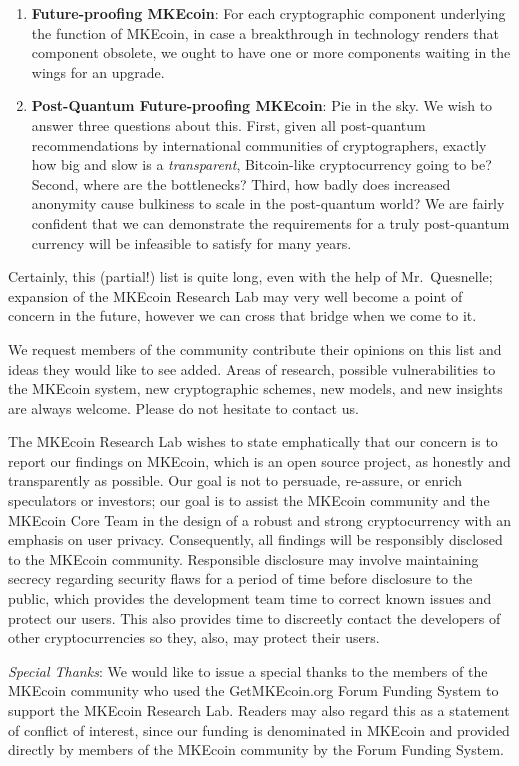 \documentclass[12pt,english]{mrl}
\theoremstyle{definition}
\numberwithin{equation}{section}
\numberwithin{figure}{section}
\numberwithin{equation}{section}
\numberwithin{equation}{section}
\numberwithin{figure}{section}
\begin{document}
\begin{enumerate}[1.]
    \item \textbf{Future-proofing MKEcoin}: For each cryptographic component underlying the function of MKEcoin, in case a breakthrough in technology renders that component obsolete, we ought to have one or more components waiting in the wings for an upgrade.
    
    \item \textbf{Post-Quantum Future-proofing MKEcoin}: Pie in the sky. We wish to answer three questions about this. First, given all post-quantum recommendations by international communities of cryptographers, exactly how big and slow is a \textit{transparent}, Bitcoin-like cryptocurrency going to be? Second, where are the bottlenecks? Third, how badly does increased anonymity cause bulkiness to scale in the post-quantum world? We are fairly confident that we can demonstrate the requirements for a truly post-quantum currency will be infeasible to satisfy for many years.
    
    
    
    
    
\end{enumerate}


Certainly, this (partial!) list is quite long, even with the help of Mr.\ Quesnelle; expansion of the MKEcoin Research Lab may very well become a point of concern in the future, however we can cross that bridge when we come to it. 

We request members of the community contribute their opinions on this list and ideas they would like to see added. Areas of research, possible vulnerabilities to the MKEcoin system, new cryptographic schemes, new models, and new insights are always welcome. Please do not hesitate to contact us.  

The MKEcoin Research Lab wishes to state emphatically that our concern is to report our findings on MKEcoin, which is an open source project, as honestly and transparently as possible. Our goal is not to persuade, re-assure, or enrich speculators or investors; our goal is to assist the MKEcoin community and the MKEcoin Core Team in the design of a robust and strong cryptocurrency with an emphasis on user privacy.  Consequently, all findings will be responsibly disclosed to the MKEcoin community. Responsible disclosure may involve maintaining secrecy regarding security flaws for a period of time before disclosure to the public, which provides the development team time to correct known issues and protect our users. This also provides time to discreetly contact the developers of other cryptocurrencies so they, also, may protect their users.




\emph{Special Thanks}: We would like to issue a special thanks to the members of the MKEcoin community who used the GetMKEcoin.org Forum Funding System to support the MKEcoin Research Lab. Readers may also regard this as a statement of conflict of interest, since our funding is denominated in MKEcoin and provided directly by members of the MKEcoin community by the Forum Funding System.

\medskip{}



\end{document}
